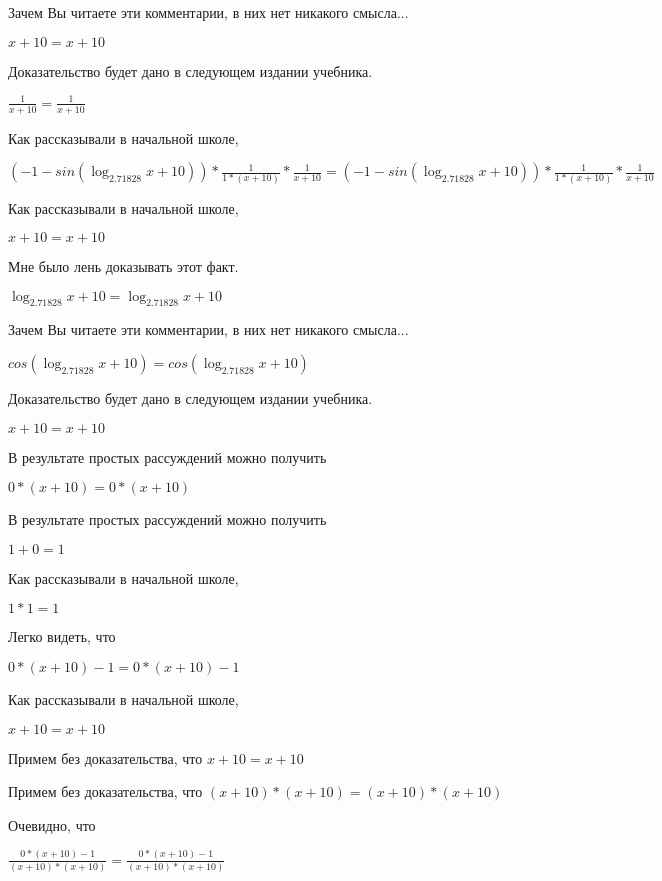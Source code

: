 \documentclass[12pt,a4paper,fleqn]{article}
\theoremstyle{definition}
\begin{document}
Зачем Вы читаете эти комментарии, в них нет никакого смысла...

$ x  +  10  =  x  +  10 $

Доказательство будет дано в следующем издании учебника.

$\frac{ 1 }{ x  +  10 }
 = \frac{ 1 }{ x  +  10 }
$

Как рассказывали в начальной школе,

$( -1  - sin(\log_{ 2.71828 }{ x  +  10 })) * \frac{ 1 }{ 1  * ( x  +  10 )}
 * \frac{ 1 }{ x  +  10 }
 = ( -1  - sin(\log_{ 2.71828 }{ x  +  10 })) * \frac{ 1 }{ 1  * ( x  +  10 )}
 * \frac{ 1 }{ x  +  10 }
$

Как рассказывали в начальной школе,

$ x  +  10  =  x  +  10 $

Мне было лень доказывать этот факт.

$\log_{ 2.71828 }{ x  +  10 } = \log_{ 2.71828 }{ x  +  10 }$

Зачем Вы читаете эти комментарии, в них нет никакого смысла...

$cos(\log_{ 2.71828 }{ x  +  10 }) = cos(\log_{ 2.71828 }{ x  +  10 })$

Доказательство будет дано в следующем издании учебника.

$ x  +  10  =  x  +  10 $

В результате простых рассуждений можно получить

$ 0  * ( x  +  10 ) =  0  * ( x  +  10 )$

В результате простых рассуждений можно получить

$ 1  +  0  =  1 $

Как рассказывали в начальной школе,

$ 1  *  1  =  1 $

Легко видеть, что

$ 0  * ( x  +  10 ) -  1  =  0  * ( x  +  10 ) -  1 $

Как рассказывали в начальной школе,

$ x  +  10  =  x  +  10 $

Примем без доказательства, что
$ x  +  10  =  x  +  10 $

Примем без доказательства, что
$( x  +  10 ) * ( x  +  10 ) = ( x  +  10 ) * ( x  +  10 )$

Очевидно, что

$\frac{ 0  * ( x  +  10 ) -  1 }{( x  +  10 ) * ( x  +  10 )}
 = \frac{ 0  * ( x  +  10 ) -  1 }{( x  +  10 ) * ( x  +  10 )}
$
\end{document}
